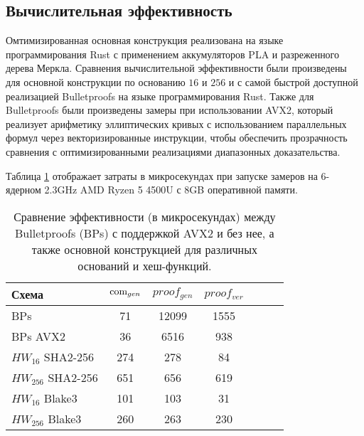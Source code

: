 \subsection{Вычислительная эффективность} %
Омтимизированная основная конструкция реализована на языке программирования Rust с применением аккумуляторов PLA и разреженного дерева Меркла.
Сравнения вычислительной эффективности были произведены для основной конструкции по основанию $16$ и $256$ и с самой быстрой доступной реализацией Bulletproofs на языке программирования Rust.
Также для Bulletproofs были произведены замеры при использовании AVX2, который реализует арифметику эллиптических кривых с использованием параллельных формул через векторизированные инструкции, чтобы обеспечить прозрачность сравнения с оптимизированными реализациями диапазонных доказательства.

Таблица \ref{table:2} отображает затраты в микросекундах при запуске замеров на 6-ядерном 2.3GHz AMD Ryzen 5 4500U с 8GB оперативной памяти.

\begin{table}[h]
	\centering
    \begin{tabular}{|l|c|c|c|c|c|c|}
        \hline
		Схема               & $\text{com}_{gen}$ & $proof_{gen}$ & $proof_{ver}$ \\ \hline
        BPs                 & 71           & 12099         & 1555          \\ \hline
        BPs AVX2            & 36           & 6516          & 938           \\ \hline
        $HW_{16}$  SHA2-256 & 274          & 278           & 84            \\ \hline
        $HW_{256}$ SHA2-256 & 651          & 656           & 619           \\ \hline
        $HW_{16}$  Blake3   & 101          & 103           & 31            \\ \hline
        $HW_{256}$ Blake3   & 260          & 263           & 230           \\ \hline
    \end{tabular}
	\label{table:2}
	\caption{Сравнение эффективности (в микросекундах) между Bulletproofs (BPs) с поддержкой AVX2 и без нее, а также основной конструкцией для различных оснований и хеш-функций.}
\end{table}

